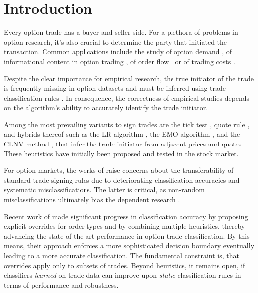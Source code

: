 \section{Introduction}\label{sec:introduction}

Every option trade has a buyer and seller side. For a plethora of problems in option research, it’s also crucial to determine the party that initiated the transaction. Common applications include the study of option demand \autocite[][4261]{garleanuDemandBasedOptionPricing2009}, of informational content in option trading \autocites[][631]{huDoesOptionTrading2014}[][882]{panInformationOptionVolume2006}[][1079]{caoInformationalContentOption2005}, of order flow \autocite[][684]{muravyevOrderFlowExpected2016}, or of trading costs \autocite[][4980]{muravyevOptionsTradingCosts2020}. 

Despite the clear importance for empirical research, the true initiator of the trade is frequently missing in option datasets and must be inferred using trade classification rules \autocite[][453]{easleyOptionVolumeStock1998}. In consequence, the correctness of empirical studies depends on the algorithm's ability to accurately identify the trade initiator.

Among the most prevailing variants to sign trades are the tick test \autocite[][240]{hasbrouckTradesQuotesInventories1988}, quote rule \autocite[][41]{harrisDayEndTransactionPrice1989}, and hybrids thereof such as the \gls{LR} algorithm \autocite[][745]{leeInferringTradeDirection1991}, the \gls{EMO} algorithm \autocite[][536]{ellisAccuracyTradeClassification2000}, and the \gls{CLNV} method \autocite[][3812]{chakrabartyTradeClassificationAlgorithms2007}, that infer the trade initiator from adjacent prices and quotes. These heuristics have initially been proposed and tested in the stock market.

For option markets, the works of \textcites[][11--13]{grauerOptionTradeClassification2022}[][887--891]{savickasInferringDirectionOption2003} raise concerns about the transferability of standard trade signing rules due to deteriorating classification accuracies and systematic misclassifications. The latter is critical, as non-random misclassifications ultimately bias the dependent research \autocites[][260]{odders-whiteOccurrenceConsequencesInaccurate2000}[][157]{theissenTestAccuracyLee2001}.

Recent work of \textcite[][13--16]{grauerOptionTradeClassification2022} made significant progress in classification accuracy by proposing explicit overrides for order types and by combining multiple heuristics, thereby advancing the state-of-the-art performance in option trade classification. By this means, their approach enforces a more sophisticated decision boundary eventually leading to a more accurate classification. The fundamental constraint is, that overrides apply only to subsets of trades. Beyond heuristics, it remains open, if classifiers \emph{learned} on trade data can improve upon \emph{static} classification rules in terms of performance and robustness.

